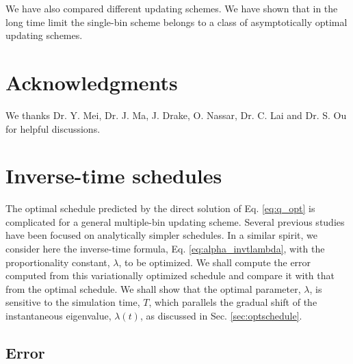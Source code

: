 \documentclass[reprint, floatfix]{revtex4-1}
\begin{document}
We have also compared different updating schemes.
%
We have shown that in the long time limit
the single-bin scheme belongs to a class of
asymptotically optimal updating schemes.
%



\section{Acknowledgments}

We thanks
Dr. Y. Mei, Dr. J. Ma,
J. Drake, O. Nassar, Dr. C. Lai and Dr. S. Ou
for helpful discussions.


\appendix





\section{\label{sec:invt_schedule}
Inverse-time schedules}



The optimal schedule predicted
by the direct solution of Eq. \eqref{eq:q_opt}
is complicated for a general
multiple-bin updating scheme.
%
Several previous studies\cite{marsili2006, barducci2008, dickson2011}
have been focused on analytically simpler schedules.
%
In a similar spirit,
we consider here
the inverse-time formula,
Eq. \eqref{eq:alpha_invtlambda},
%
with the proportionality constant, $\lambda$,
to be optimized.
%
We shall compute the error computed from
this variationally optimized schedule
and compare it with that from the optimal schedule.
%
We shall show that the optimal parameter, $\lambda$,
is sensitive to the simulation time, $T$,
which parallels the gradual shift of
the instantaneous eigenvalue,
$\lambda(t)$,
as discussed in Sec. \ref{sec:optschedule}.



\subsection{\label{sec:invt_error}
Error
}
\end{document}

